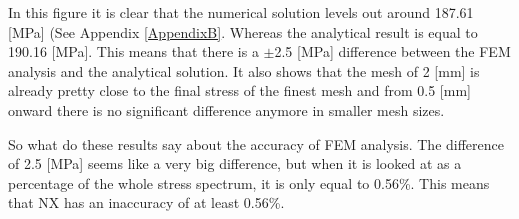 In this figure it is clear that the numerical solution levels out around 187.61 [MPa] (See Appendix \ref{AppendixB}. Whereas the analytical result is equal to 190.16 [MPa]. This means that there is a $\pm$2.5 [MPa] difference between the FEM analysis and the analytical solution. It also shows that the mesh of 2 [mm] is already pretty close to the final stress of the finest mesh and from 0.5 [mm] onward there is no significant difference anymore in smaller mesh sizes.


So what do these results say about the accuracy of FEM analysis. The difference of 2.5 [MPa] seems like a very big difference, but when it is looked at as a percentage of the whole stress spectrum, it is only equal to 0.56\%. This means that NX has an inaccuracy of at least 0.56\%.





